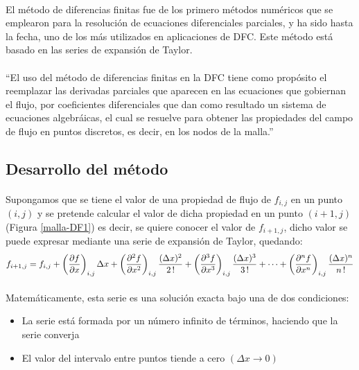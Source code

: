 \documentclass[letterpaper, openright, 12pt]{book}
\begin{document}
    \paragraph*{}
        El método de diferencias finitas fue de los primero métodos numéricos
        que se emplearon para la resolución de ecuaciones diferenciales
        parciales, y ha sido hasta la fecha, uno de los más utilizados en
        aplicaciones de DFC. Este método está basado en las series de expansión
        de Taylor.

    \paragraph*{}
    ``El uso del método de diferencias finitas en la DFC tiene como propósito el
    reemplazar las derivadas parciales que aparecen en las ecuaciones que
    gobiernan el flujo, por coeficientes diferenciales que dan como resultado un
    sistema de ecuaciones algebráicas, el cual se resuelve para obtener las
    propiedades del campo de flujo en puntos discretos, es decir, en los nodos
    de la malla.'' \cite{anderson-yotros}

    \subsection{Desarrollo del método}
    \paragraph*{}
        Supongamos que se tiene el valor de una propiedad de flujo de $f_{i,j}$
        en un punto $(i,j)$ y se pretende calcular el valor de dicha propiedad
        en un punto $(i+1,j)$ (Figura \ref{malla-DF1}) es decir, se quiere
        conocer el valor de $f_{i+1,j}$, dicho valor se puede expresar mediante
        una serie de expansión de Taylor, quedando:
    \begin{equation}
    f_{i+1,j} = f_{i,j} + \left(\pdv{f}{x} \right)_{i,j} \Delta x + \left( \pdv[2]{f}{x} \right)_{i,j} \frac{(\Delta x)^2}{2\,!} + \left(\pdv[3]{f}{x} \right)_{i,j} \frac{ (\Delta x)^3 }{3\,!} + \dotsb + \left( \pdv[n]{f}{x} \right)_{i,j} \frac{ (\Delta x)^n }{n\,!}
    \label{taylor-forward}
    \end{equation}

    \paragraph*{}
    Matemáticamente, esta serie es una solución exacta bajo una de dos condiciones:
    \begin{itemize}
        \item La serie está formada por un número infinito de términos, haciendo que la serie converja
        \item El valor del intervalo entre puntos tiende a cero $(\Delta x \rightarrow 0)$
    \end{itemize}
\end{document}
